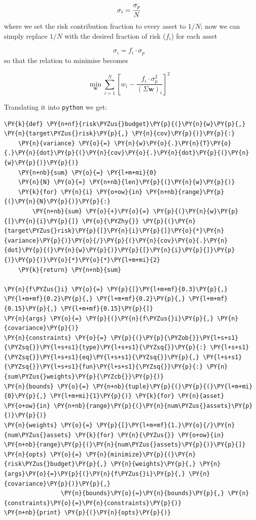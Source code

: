 \[ \sigma _{i}=\cfrac{\sigma_p}{N} \]
where we set the risk contribution fraction to every asset to \(1/N\);
now we can simply replace \(1/N\) with the desired fraction of risk (\(f_i\)) for each asset

\[ \sigma _{i}=f_i \cdot \sigma_p \]
so that the relation to minimise becomes

\[ \underset{\mathbf{w}}{\min} \sum _{i=1}^{N}\left[w_{i}-{\frac {f_i \cdot \sigma_p^{2}}{(\Sigma \mathbf{w})_{i}}}\right]^{2} \]

Translating it into \texttt{python} we get:

\begin{tcolorbox}[breakable, size=fbox, boxrule=1pt, pad at break*=1mm,colback=cellbackground, colframe=cellborder]
\begin{Verbatim}[commandchars=\\\{\}]
\PY{k}{def} \PY{n+nf}{risk\PYZus{}budget}\PY{p}{(}\PY{n}{w}\PY{p}{,} \PY{n}{target\PYZus{}risk}\PY{p}{,} \PY{n}{cov}\PY{p}{)}\PY{p}{:}
    \PY{n}{variance} \PY{o}{=} \PY{n}{w}\PY{o}{.}\PY{n}{T}\PY{o}{.}\PY{n}{dot}\PY{p}{(}\PY{n}{cov}\PY{o}{.}\PY{n}{dot}\PY{p}{(}\PY{n}{w}\PY{p}{)}\PY{p}{)} 
    \PY{n+nb}{sum} \PY{o}{=} \PY{l+m+mi}{0}
    \PY{n}{N} \PY{o}{=} \PY{n+nb}{len}\PY{p}{(}\PY{n}{w}\PY{p}{)}
    \PY{k}{for} \PY{n}{i} \PY{o+ow}{in} \PY{n+nb}{range}\PY{p}{(}\PY{n}{N}\PY{p}{)}\PY{p}{:}
        \PY{n+nb}{sum} \PY{o}{+}\PY{o}{=} \PY{p}{(}\PY{n}{w}\PY{p}{[}\PY{n}{i}\PY{p}{]} \PY{o}{\PYZhy{}} \PY{p}{(}\PY{n}{target\PYZus{}risk}\PY{p}{[}\PY{n}{i}\PY{p}{]}\PY{o}{*}\PY{n}{variance}\PY{p}{)}\PY{o}{/}\PY{p}{(}\PY{n}{cov}\PY{o}{.}\PY{n}{dot}\PY{p}{(}\PY{n}{w}\PY{p}{)}\PY{p}{[}\PY{n}{i}\PY{p}{]}\PY{p}{)}\PY{p}{)}\PY{o}{*}\PY{o}{*}\PY{l+m+mi}{2} 
    \PY{k}{return} \PY{n+nb}{sum}
		
\PY{n}{f\PYZus{}i} \PY{o}{=} \PY{p}{[}\PY{l+m+mf}{0.3}\PY{p}{,} \PY{l+m+mf}{0.2}\PY{p}{,} \PY{l+m+mf}{0.2}\PY{p}{,} \PY{l+m+mf}{0.15}\PY{p}{,} \PY{l+m+mf}{0.15}\PY{p}{]} 
\PY{n}{args} \PY{o}{=} \PY{p}{(}\PY{n}{f\PYZus{}i}\PY{p}{,} \PY{n}{covariance}\PY{p}{)}
\PY{n}{constraints} \PY{o}{=} \PY{p}{(}\PY{p}{\PYZob{}}\PY{l+s+s1}{\PYZsq{}}\PY{l+s+s1}{type}\PY{l+s+s1}{\PYZsq{}}\PY{p}{:} \PY{l+s+s1}{\PYZsq{}}\PY{l+s+s1}{eq}\PY{l+s+s1}{\PYZsq{}}\PY{p}{,} \PY{l+s+s1}{\PYZsq{}}\PY{l+s+s1}{fun}\PY{l+s+s1}{\PYZsq{}}\PY{p}{:} \PY{n}{sum\PYZus{}weights}\PY{p}{\PYZcb{}}\PY{p}{)}          
\PY{n}{bounds} \PY{o}{=} \PY{n+nb}{tuple}\PY{p}{(}\PY{p}{(}\PY{l+m+mi}{0}\PY{p}{,} \PY{l+m+mi}{1}\PY{p}{)} \PY{k}{for} \PY{n}{asset} \PY{o+ow}{in} \PY{n+nb}{range}\PY{p}{(}\PY{n}{num\PYZus{}assets}\PY{p}{)}\PY{p}{)}
\PY{n}{weights} \PY{o}{=} \PY{p}{[}\PY{l+m+mf}{1.}\PY{o}{/}\PY{n}{num\PYZus{}assets} \PY{k}{for} \PY{n}{\PYZus{}} \PY{o+ow}{in} \PY{n+nb}{range}\PY{p}{(}\PY{n}{num\PYZus{}assets}\PY{p}{)}\PY{p}{]}
\PY{n}{opts} \PY{o}{=} \PY{n}{minimize}\PY{p}{(}\PY{n}{risk\PYZus{}budget}\PY{p}{,} \PY{n}{weights}\PY{p}{,} \PY{n}{args}\PY{o}{=}\PY{p}{(}\PY{n}{f\PYZus{}i}\PY{p}{,} \PY{n}{covariance}\PY{p}{)}\PY{p}{,} 
                \PY{n}{bounds}\PY{o}{=}\PY{n}{bounds}\PY{p}{,} \PY{n}{constraints}\PY{o}{=}\PY{n}{constraints}\PY{p}{)}
\PY{n+nb}{print} \PY{p}{(}\PY{n}{opts}\PY{p}{)}
		

\end{Verbatim}
\end{tcolorbox}
